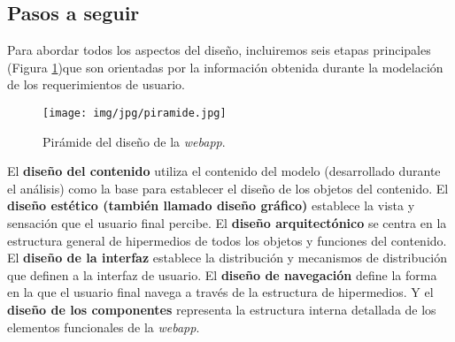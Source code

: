 \documentclass[a4paper,oneside,11pt]{book}
\begin{document}
		\subsection{Pasos a seguir} %
		\label{sub:pasos_a_seguir}
		
			Para abordar todos los aspectos del diseño, incluiremos seis etapas principales (Figura \ref{fig:dis_piramide})que son orientadas por la información obtenida durante la modelación de los requerimientos de usuario. 
		   
		   \begin{figure}[H]
		     \centering
		       \texttt{[image: img/jpg/piramide.jpg]}
		     \caption{Pirámide del diseño de la \textit{webapp}.}
		     \label{fig:dis_piramide}
		   \end{figure}
			
			
			El \textbf{diseño del contenido} utiliza el contenido del modelo (desarrollado durante el análisis) como la base para establecer el diseño de los objetos del contenido. El \textbf{diseño estético (también llamado diseño gráfico)} establece la vista y sensación que el usuario final percibe. El \textbf{diseño arquitectónico} se centra en la estructura general de  hipermedios de todos los objetos y funciones del contenido. El \textbf{diseño de la interfaz} establece la distribución y mecanismos de distribución que definen a la interfaz de usuario. El \textbf{diseño de navegación} define la forma en la que el usuario final navega a través de la estructura de hipermedios. Y el \textbf{diseño de los componentes} representa la estructura interna detallada de los elementos funcionales de la \textit{webapp}.
		
	
	
	
\end{document}
